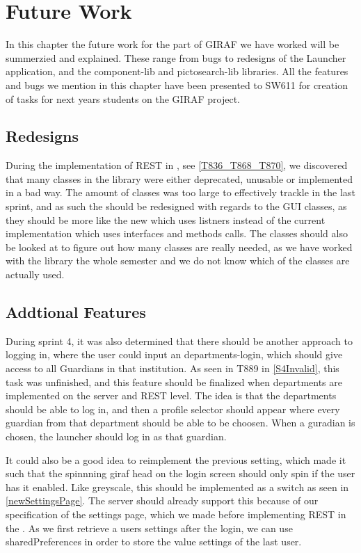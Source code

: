 \chapter{Future Work}\label{fwork}
In this chapter the future work for the part of GIRAF we have worked will be
summerzied and explained. These range from bugs to redesigns of the Launcher
application, and the component-lib and pictosearch-lib libraries.
All the features and bugs we mention in this chapter have been presented to
SW611 for creation of tasks for next years students on the GIRAF project.

\section{Redesigns}
During the implementation of REST in , see
\autoref{T836_T868_T870}, we discovered that many classes in the library were
either deprecated, unusable or implemented in a bad way. The amount of classes
was too large to effectively trackle in the last sprint, and as such the
 should be redesigned with regards to the GUI classes, as
they should be more like the new  which uses listners
instead of the current implementation which uses interfaces and methods calls.
The classes should also be looked at to figure out how many classes are really
needed, as we have worked with the library the whole semester and we do not
know which of the classes are actually used.

\section{Addtional Features}
During sprint 4, it was also determined that there should be another
approach to logging in, where the user could input an departments-login, which
should give access to all Guardians in that institution. As seen in T889 in
\autoref{S4Invalid}, this task was unfinished, and this feature should be
finalized when departments are implemented on the server and REST level. The
idea is that the departments should be able to log in, and then a profile
selector should appear where every guardian from that department should be able
to be choosen. When a guradian is chosen, the launcher should log in as that
guardian.\nl

It could also be a good idea to reimplement the previous setting, which made it
such that the spinnning giraf head on the login screen should only spin if the
user has it enabled. Like greyscale, this should be implemented as a switch as
seen in \autoref{newSettingsPage}. The server should already support this
because of our specification of the settings page, which we made before
implementing REST in the . As we first retrieve a users settings
after the login, we can use sharedPreferences in order to store the value
settings of the last user.

